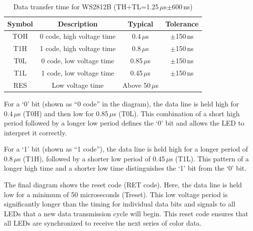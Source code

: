\begin{table}[H]
	\begin{center}
		\caption[Data transfer time for WS2812B]{Data transfer time for WS2812B (TH+TL=1.25\,$\mu$s$\pm$600\,ns) \cite[see][3]{Worldsemi:2024}}
		\label{WS2812BTransferTime}
		\begin{tabular}{|c|c|c|c|}
			\hline
			\textbf{Symbol} & \textbf{Description} & \textbf{Typical} & \textbf{Tolerance} \\
			\hline
			TOH & 0 code, high voltage time & 0.4\,$\mu$s & $\pm$150\,ns \\
			\hline
			T1H & 1 code, high voltage time & 0.8\,$\mu$s & $\pm$150\,ns \\
			\hline
			T0L & 0 code, low voltage time & 0.85\,$\mu$s & $\pm$150\,ns \\
			\hline
			T1L & 1 code, low voltage time & 0.45\,$\mu$s & $\pm$150\,ns \\
			\hline
			RES & Low voltage time & Above 50\,$\mu$s &\\
			\hline
		\end{tabular}
	\end{center}
\end{table}

For a ‘0’ bit (shown as “0 code” in the diagram), the data line is held high for 0.4\,$\mu$s (T0H) and then low for 0.85\,$\mu$s (T0L). This combination of a short high period followed by a longer low period defines the ‘0’ bit and allows the LED to interpret it correctly.

For a ‘1’ bit (shown as “1 code”), the data line is held high for a longer period of 0.8\,$\mu$s (T1H), followed by a shorter low period of 0.45\,$\mu$s (T1L). This pattern of a longer high time and a shorter low time distinguishes the ‘1’ bit from the ‘0’ bit.

The final diagram shows the reset code (RET code). Here, the data line is held low for a minimum of 50 microseconds (Treset). This low voltage period is significantly longer than the timing for individual data bits and signals to all LEDs that a new data transmission cycle will begin. This reset code ensures that all LEDs are synchronized to receive the next series of color data.

